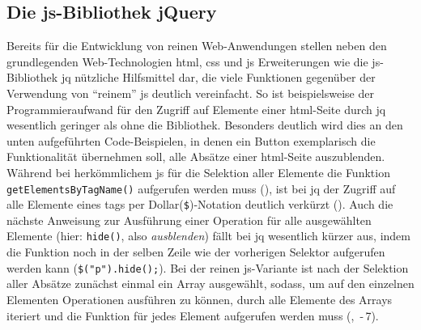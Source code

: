\subsection{Die \gls{js}-Bibliothek jQuery}

Bereits für die Entwicklung von reinen Web-Anwendungen stellen neben den grundlegenden Web-Technologien \gls{html}, \gls{css} und \gls{js} Erweiterungen wie die \gls{js}-Bibliothek \gls{jq} nützliche Hilfsmittel dar, die viele Funktionen gegenüber der Verwendung von \enquote{reinem} \gls{js} deutlich vereinfacht.
So ist beispielsweise der Programmieraufwand für den Zugriff auf Elemente einer \gls{html}-Seite durch \gls{jq} wesentlich geringer als ohne die Bibliothek.
Besonders deutlich wird dies an den unten aufgeführten Code-Beispielen, in denen ein Button exemplarisch die Funktionalität übernehmen soll, alle Absätze einer \gls{html}-Seite auszublenden.
Während bei herkömmlichem \gls{js} für die Selektion aller Elemente die Funktion \lstinline|getElementsByTagName()| aufgerufen werden muss (), ist bei \gls{jq} der Zugriff auf alle Elemente eines \glspl{tag} per Dollar(\lstinline|$|)-Notation deutlich verkürzt ().
Auch die nächste Anweisung zur Ausführung einer Operation für alle ausgewählten Elemente (hier: \lstinline|hide()|, also \textit{ausblenden}) fällt bei \gls{jq} wesentlich kürzer aus, indem die Funktion noch in der selben Zeile wie der vorherigen Selektor aufgerufen werden kann (\lstinline|$("p").hide();|).
Bei der reinen \gls{js}-Variante ist nach der Selektion aller Absätze zunächst einmal ein Array ausgewählt, sodass, um auf den einzelnen Elementen Operationen ausführen zu können, durch alle Elemente des Arrays iteriert und die Funktion für jedes Element aufgerufen werden muss (, \,-\,7).


	

